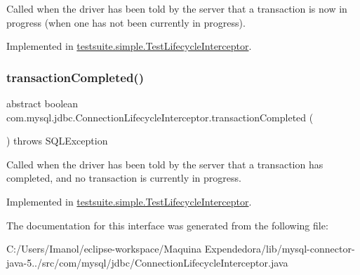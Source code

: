 Called when the driver has been told by the server that a transaction is now in progress (when one has not been currently in progress). 

Implemented in \mbox{\hyperlink{classtestsuite_1_1simple_1_1_test_lifecycle_interceptor_a5ca18da030f4569891254990898f9c1b}{testsuite.\+simple.\+Test\+Lifecycle\+Interceptor}}.

\mbox{\label{interfacecom_1_1mysql_1_1jdbc_1_1_connection_lifecycle_interceptor_a439077fdf5cb12487a9689838a1983e6}} 
\subsubsection{\texorpdfstring{transaction\+Completed()}{transactionCompleted()}}
{\footnotesize\ttfamily abstract boolean com.\+mysql.\+jdbc.\+Connection\+Lifecycle\+Interceptor.\+transaction\+Completed (\begin{DoxyParamCaption}{ }\end{DoxyParamCaption}) throws S\+Q\+L\+Exception\hspace{0.3cm}{\ttfamily [abstract]}}

Called when the driver has been told by the server that a transaction has completed, and no transaction is currently in progress. 

Implemented in \mbox{\hyperlink{classtestsuite_1_1simple_1_1_test_lifecycle_interceptor_a00973c1a52ebc81176be2b9a46f5aa66}{testsuite.\+simple.\+Test\+Lifecycle\+Interceptor}}.



The documentation for this interface was generated from the following file\+:\begin{DoxyCompactItemize}
\item 
C\+:/\+Users/\+Imanol/eclipse-\/workspace/\+Maquina Expendedora/lib/mysql-\/connector-\/java-\/5../src/com/mysql/jdbc/Connection\+Lifecycle\+Interceptor.\+java\end{DoxyCompactItemize}
